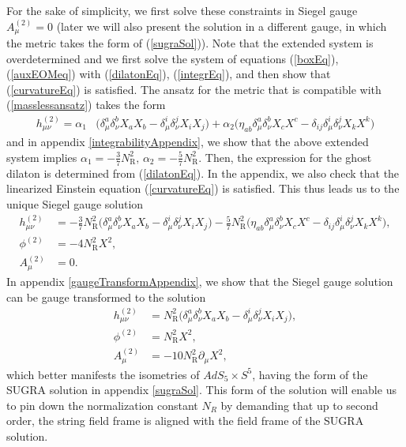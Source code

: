 \documentclass[12pt]{article}
\def\be{\begin{equation}}
\def\ee{\end{equation}}
\numberwithin{equation}{section}
\begin{document}
For the sake of simplicity, we first solve these constraints in Siegel gauge $A_\mu^{(2)} = 0$ (later we will also present the solution in a different gauge, in which the metric takes the form of (\ref{sugraSol})). Note that the extended system is overdetermined and we first solve the system of equations (\ref{boxEq}), (\ref{auxEOMeq}) with (\ref{dilatonEq}), (\ref{integrEq}), and then show that (\ref{curvatureEq}) is satisfied. The ansatz for the metric that is compatible with (\ref{masslessansatz}) takes the form
\be
\begin{aligned}
    \label{hAnsatz}
    h^{(2)}_{ \mu \nu} =  \alpha_1 &\big(\delta^a_\mu \delta^b_\nu X_a X_b - \delta^i_\mu \delta^j_\nu X_i X_j\big) + \alpha_2 \big(\eta_{ab}\delta_{\mu}^a\delta_{\nu}^bX_cX^c-\delta_{ij}\delta_{\mu}^i\delta_{\nu}^jX_kX^k\big)
\end{aligned}
\ee
and in appendix \ref{integrabilityAppendix}, we show that the above extended system implies $\alpha_1 = -\frac{3}{7} N_{\text{R}}^2, \, \alpha_2 = -\frac{5}{7} N_{\text{R}}^2$. Then, the expression for the ghost dilaton is determined from (\ref{dilatonEq}). In the appendix, we also check that the linearized Einstein equation (\ref{curvatureEq}) is satisfied. This thus leads us to the unique Siegel gauge solution
\be
\begin{aligned}
    h^{(2)}_{\mu \nu} &=-\frac{3}{7} N_{\text{R}}^2 \big(\delta^a_\mu \delta^b_\nu X_a X_b - \delta^i_\mu \delta^j_\nu X_i X_j\big) -\frac{5}{7} N_{\text{R}}^2 \big(\eta_{ab}\delta_{\mu}^a\delta_{\nu}^bX_cX^c-
    \delta_{ij}\delta_{\mu}^i\delta_{\nu}^jX_kX^k\big), \\
	    \phi^{(2)} &= - 4 N_{\text{R}}^2 X^2 ,\\
    A^{(2)}_\mu &= 0.
    \label{ssol}
\end{aligned}
\ee
In appendix \ref{gaugeTransformAppendix}, we show that the Siegel gauge solution can be gauge transformed to the solution
\be
\begin{aligned}
	h^{(2)}_{\mu \nu} &=N_{\text{R}}^2\big(\delta^a_\mu \delta^b_\nu X_a X_b - \delta^i_\mu \delta^j_\nu X_i X_j\big),\\
	\phi^{(2)} &= N_{\text{R}}^2X^2 ,\\
	A^{(2)}_\mu &= -10 N_{\text{R}}^2\partial_\mu X^2,
	\label{oos}
\end{aligned}
\ee
which better manifests the isometries of $AdS_5 \times S^5$, having the form of the SUGRA solution in appendix \ref{sugraSol}. This form of the solution will enable us to pin down the normalization constant $N_R$ by demanding that up to second order, the string field frame is aligned with the field frame of the SUGRA solution.
\end{document}
